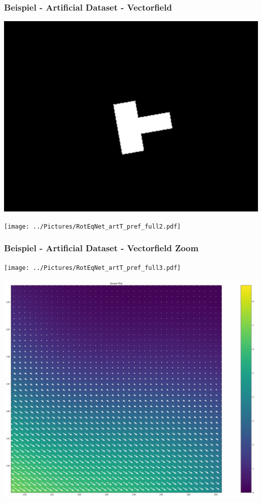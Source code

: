 \begin{frame}
\frametitle{Beispiel - Artificial Dataset - Vectorfield}
\begin{minipage}{0.49\textwidth}
\includegraphics[width=\linewidth]{../Pictures/RotEqNet2.png}
\end{minipage}
\begin{minipage}{0.49\textwidth}
\texttt{[image: ../Pictures/RotEqNet\_artT\_pref\_full2.pdf]}
\end{minipage}
\end{frame}

\begin{frame}
\frametitle{Beispiel - Artificial Dataset - Vectorfield Zoom}
\begin{minipage}{0.49\textwidth}
	\texttt{[image: ../Pictures/RotEqNet\_artT\_pref\_full3.pdf]}
\end{minipage}
\begin{minipage}{0.49\textwidth}
	\includegraphics[width=\linewidth]{../Pictures/RotEqNet_artT_pref_scale2.pdf}
\end{minipage}
\end{frame}
